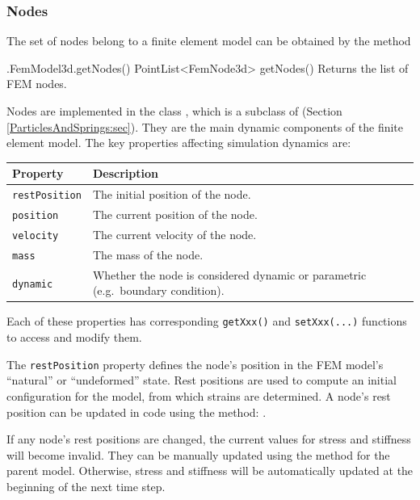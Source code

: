 \subsubsection{Nodes}
\ifLaTeXML{\newline}

The set of nodes belong to a finite element model can be obtained by the method
%
\begin{methodtable}{0.5}{0.5}
\midline
%
\methodentry
{\fem.FemModel3d.getNodes()}%
{PointList<FemNode3d> getNodes()}%
{Returns the list of FEM nodes.}%
%
\midline
\end{methodtable}
%
Nodes are implemented in the class 
, which is a subclass of 
 (Section 
\ref{ParticlesAndSprings:sec}).  They are the main dynamic components of
the finite element model.  The key properties affecting simulation dynamics
are:
\begin{center}
\begin{tabular}{|ll|}
  \hline
  Property & Description\\
  \hline
  {\tt restPosition} & The initial position of the node.\\
  {\tt position} & The current position of the node.\\
  {\tt velocity} & The current velocity of the node.\\
  {\tt mass} & The mass of the node.\\
  {\tt dynamic} & Whether the node is considered dynamic or parametric 
                  (e.g.~boundary condition).\\
  \hline
\end{tabular}
\end{center}
Each of these properties has corresponding {\tt getXxx()} and 
{\tt setXxx(...)} functions to access and modify them.

The {\tt restPosition} property defines the node's position in the FEM model's 
``natural'' or ``undeformed'' state.  Rest positions are used to compute
an initial configuration for the model, from which strains are determined.  A
node's rest position can be updated in code using the method:
.

\begin{sideblock}
If any node's rest positions are changed, the current values 
for stress and stiffness will become invalid.  They can be manually
updated using the method  for the parent model. Otherwise,
stress and stiffness will be automatically updated at the beginning of the 
next time step. 
\end{sideblock}

